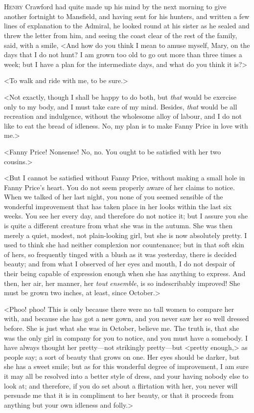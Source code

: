 \chapter[Chapter \thechapter]{} 

 \lettrine[lraise=0.3]{H}{enry} Crawford had quite made up his mind by the next morning to give another fortnight to Mansfield, and having sent for his hunters, and written a few lines of explanation to the Admiral, he looked round at his sister as he sealed and threw the letter from him, and seeing the coast clear of the rest of the family, said, with a smile, <And how do you think I mean to amuse myself, Mary, on the days that I do not hunt? I am grown too old to go out more than three times a week; but I have a plan for the intermediate days, and what do you think it is?>

<To walk and ride with me, to be sure.>

<Not exactly, though I shall be happy to do both, but \textit{that}  would be exercise only to my body, and I must take care of my mind. Besides, \textit{that}  would be all recreation and indulgence, without the wholesome alloy of labour, and I do not like to eat the bread of idleness. No, my plan is to make Fanny Price in love with me.>

<Fanny Price! Nonsense! No, no. You ought to be satisfied with her two cousins.>

<But I cannot be satisfied without Fanny Price, without making a small hole in Fanny Price's heart. You do not seem properly aware of her claims to notice. When we talked of her last night, you none of you seemed sensible of the wonderful improvement that has taken place in her looks within the last six weeks. You see her every day, and therefore do not notice it; but I assure you she is quite a different creature from what she was in the autumn. She was then merely a quiet, modest, not plain-looking girl, but she is now absolutely pretty. I used to think she had neither complexion nor countenance; but in that soft skin of hers, so frequently tinged with a blush as it was yesterday, there is decided beauty; and from what I observed of her eyes and mouth, I do not despair of their being capable of expression enough when she has anything to express. And then, her air, her manner, her \textit{tout}  \textit{ensemble}, is so indescribably improved! She must be grown two inches, at least, since October.>

<Phoo! phoo! This is only because there were no tall women to compare her with, and because she has got a new gown, and you never saw her so well dressed before. She is just what she was in October, believe me. The truth is, that she was the only girl in company for you to notice, and you must have a somebody. I have always thought her pretty—not strikingly pretty—but <pretty enough,> as people say; a sort of beauty that grows on one. Her eyes should be darker, but she has a sweet smile; but as for this wonderful degree of improvement, I am sure it may all be resolved into a better style of dress, and your having nobody else to look at; and therefore, if you do set about a flirtation with her, you never will persuade me that it is in compliment to her beauty, or that it proceeds from anything but your own idleness and folly.>

